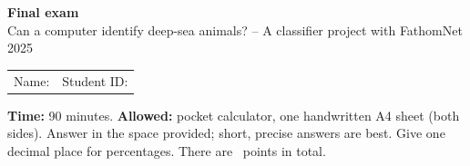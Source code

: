 \documentclass[11pt,a4paper,addpoints]{exam}
\begin{document}
\begin{center}
{\LARGE\bfseries Final exam}\\[4pt]
{\large Can a computer identify deep-sea animals? -- A classifier project with FathomNet 2025}\\[10pt]
\end{center}

\noindent\begin{tabular}{@{}p{}p{}@{}}
Name: \hrulefill & Student ID: \hrulefill \\
\end{tabular}

\vspace{8pt}
\noindent\textbf{Time:} 90 minutes. \textbf{Allowed:} pocket calculator, one handwritten A4 sheet (both sides).
Answer in the space provided; short, precise answers are best. Give one decimal place for percentages.
There are \numpoints\ points in total.

\begin{center}
\gradetable[h][questions]
\end{center}
\end{document}
